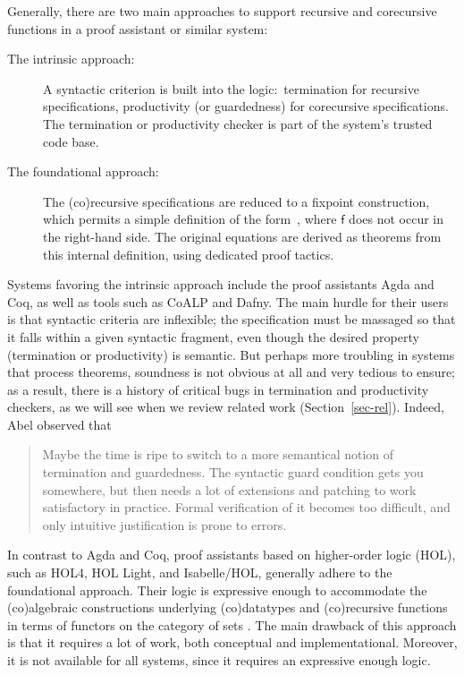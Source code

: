 \documentclass[preprint,draft]
{sigplanconf}
\newcommand\TC{\mathsf}
\newcommand{\<}{\langle}
\renewcommand{\>}{\rangle}
\newcommand\const[1]{{\ensuremath{\TC{#1}}}}
\def\S{Section~}
\begin{document}
Generally, there are two main approaches to support recursive and corecursive
functions in a proof assistant or similar system:
\begin{description}
\item[The intrinsic approach:]
A syntactic criterion is built into the logic:\ termination for recursive
specifications, productivity (or guardedness) for corecursive specifications.
The termination or productivity checker is part of the system's trusted code
base.

\item[The foundational approach:]
The (co)recursive specifications are reduced to a fixpoint construction,
which permits a simple definition of the form \,,
where \const{f} does not occur in the right-hand side.
The original equations are derived as theorems from this internal definition,
using dedicated proof tactics.
\end{description}
Systems favoring the intrinsic approach
include the proof assistants Agda and Coq, as well
as tools such as CoALP and Dafny. The main hurdle for their
users is that syntactic criteria are inflexible; the specification must be
massaged so that it falls within a given
syntactic fragment, even though the desired
property (termination or productivity) is semantic. But perhaps more troubling in
systems that process theorems, soundness is not obvious at all and very
tedious to ensure; as a result, there is a history of critical bugs in
termination and productivity checkers, as we will see when we review related work
(\S\ref{sec-rel}). Indeed, Abel \cite{abel-2013-coqml} observed that
\begin{quote}
Maybe the time is ripe to switch to a more semantical notion of termination and
guardedness. The syntactic guard condition gets you somewhere, but then needs a
lot of extensions and patching to work satisfactory in practice. Formal
verification of it becomes too difficult, and only intuitive justification is
prone to errors.
\end{quote}

In contrast to Agda and Coq, proof assistants based on higher-order logic (HOL),
such as HOL4, HOL Light, and Isabelle\slash HOL, generally adhere to the
foundational approach. Their logic
is expressive enough to accommodate the (co)algebraic constructions underlying
(co)datatypes and (co)recursive functions in terms
of functors on the category of sets \cite{traytel-et-al-2012}.
The main drawback of this approach is that
it requires a lot of work, both conceptual and implementational. Moreover, it
is not available for all systems, since it requires an expressive enough logic.
\end{document}
